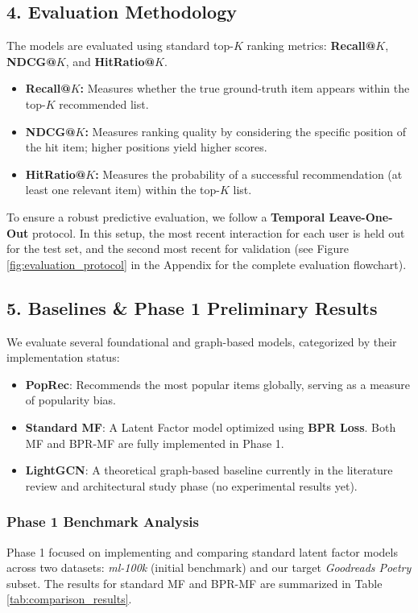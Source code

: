 \documentclass[conference]{IEEEtran}
\begin{document}
\subsection*{4. Evaluation Methodology}
The models are evaluated using standard top-$K$ ranking metrics: \textbf{Recall@$K$}, \textbf{NDCG@$K$}, and \textbf{HitRatio@$K$}. 
\begin{itemize}
    \item \textbf{Recall@$K$:} Measures whether the true ground-truth item appears within the top-$K$ recommended list.
    \item \textbf{NDCG@$K$:} Measures ranking quality by considering the specific position of the hit item; higher positions yield higher scores.
    \item \textbf{HitRatio@$K$:} Measures the probability of a successful recommendation (at least one relevant item) within the top-$K$ list.
\end{itemize}
To ensure a robust predictive evaluation, we follow a \textbf{Temporal Leave-One-Out} protocol. In this setup, the most recent interaction for each user is held out for the test set, and the second most recent for validation (see Figure \ref{fig:evaluation_protocol} in the Appendix for the complete evaluation flowchart).

\subsection*{5. Baselines \& Phase 1 Preliminary Results}
We evaluate several foundational and graph-based models, categorized by their implementation status:
\begin{itemize}
    \item \textbf{PopRec}: Recommends the most popular items globally, serving as a measure of popularity bias.
    \item \textbf{Standard MF}: A Latent Factor model optimized using \textbf{BPR Loss}. Both MF and BPR-MF are fully implemented in Phase 1.
    \item \textbf{LightGCN}: A theoretical graph-based baseline currently in the literature review and architectural study phase (no experimental results yet).
\end{itemize}

\subsubsection*{Phase 1 Benchmark Analysis}
Phase 1 focused on implementing and comparing standard latent factor models across two datasets: \textit{ml-100k} (initial benchmark) and our target \textit{Goodreads Poetry} subset. The results for standard MF and BPR-MF are summarized in Table \ref{tab:comparison_results}.
\end{document}
